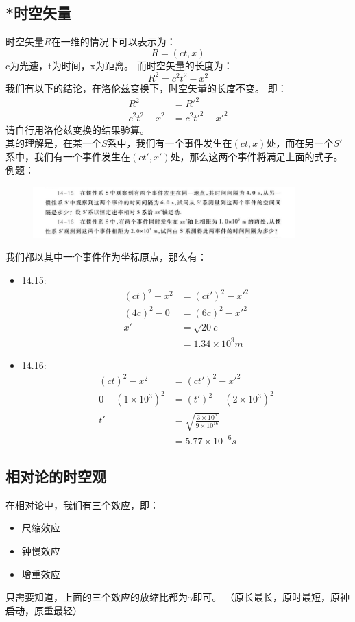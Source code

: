 \documentclass{ctexart}
\begin{document}
\subsection{*时空矢量}
时空矢量$R$在一维的情况下可以表示为：
$$
    R = (ct,x)
$$
c为光速，t为时间，x为距离。
而时空矢量的长度为：
$$
    R^2 = c^2t^2 - x^2
$$
我们有以下的结论，在洛伦兹变换下，时空矢量的长度不变。
即：
\begin{align*}
    R^2 &= R'^2 \\
    c^2t^2 - x^2 &= c^2t'^2 - x'^2
\end{align*}
请自行用洛伦兹变换的结果验算。\\
其的理解是，在某一个$S$系中，我们有一个事件发生在$(ct,x)$处，而在另一个$S'$系中，我们有一个事件发生在$(ct',x')$处，那么这两个事件将满足上面的式子。
例题：
\begin{figure}[H]
    \centering
    \includegraphics[width=0.9\textwidth]{img/14.jpg}
\end{figure}
我们都以其中一个事件作为坐标原点，那么有：
\begin{itemize}
    \item 14.15:
    \begin{align*}
        (ct)^2 - x^2 &= (ct')^2 - x'^2 \\
        (4c)^2 - 0 &= (6c)^2 - x'^2 \\
        x' &= \sqrt{20}c  \\
        &= 1.34 \times 10^9 m
    \end{align*}
    \item 14.16:
    \begin{align*}
        (ct)^2 - x^2 &= (ct')^2 - x'^2 \\
        0 - (1\times 10^3)^2 &= (t')^2 - (2 \times 10^3)^2 \\
        t' &= \sqrt{\frac{3\times 10^6}{9\times 10^{16}}} \\
        &= 5.77 \times 10^{-6}s
    \end{align*}
\end{itemize}
\subsection{相对论的时空观}
在相对论中，我们有三个效应，即：
\begin{itemize}
    \item 尺缩效应
    \item 钟慢效应
    \item 增重效应
\end{itemize}
只需要知道，上面的三个效应的放缩比都为$\gamma$即可。
（原长最长，原时最短，\sout{原神启动}，原重最轻）
\end{document}
